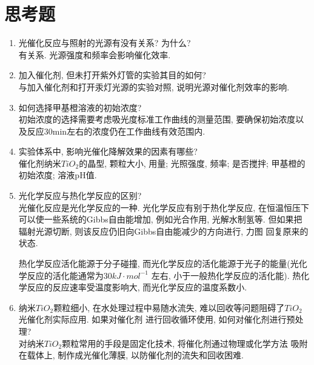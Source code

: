 \documentclass[a4paper]{article}
\begin{document}
\section{思考题}
\begin{enumerate}
	\item 光催化反应与照射的光源有没有关系? 为什么?\\
	有关系. 光源强度和频率会影响催化效率.
	\item 加入催化剂, 但未打开紫外灯管的实验其目的如何?\\
	与加入催化剂和打开汞灯光源的实验对照, 说明光源对催化剂效率的影响.
	\item 如何选择甲基橙溶液的初始浓度?\\
	初始浓度的选择需要考虑吸光度标准工作曲线的测量范围, 
	要确保初始浓度以及反应30min左右的浓度仍在工作曲线有效范围内.
	\item 实验体系中, 影响光催化降解效果的因素有哪些?\\
	催化剂纳米$TiO_{2}$的晶型, 颗粒大小, 用量; 光照强度, 频率; 是否搅拌; 
	甲基橙的初始浓度; 溶液pH值.
	\item 光化学反应与热化学反应的区别?\\
	光催化反应是光化学反应的一种. 光化学反应有别于热化学反应, 在恒温恒压下可以使一些系统的Gibbs自由能增加, 
	例如光合作用, 光解水制氢等. 但如果把辐射光源切断, 则该反应仍旧向Gibbs自由能减少的方向进行, 力图
	回复原来的状态. \par
	热化学反应活化能源于分子碰撞, 而光化学反应的活化能源于光子的能量(光化学反应的活化能通常为$30kJ\cdot mol^{-1}$
	左右, 小于一般热化学反应的活化能). 热化学反应的反应速率受温度影响大, 而光化学反应的温度系数小. \par 
	\item 纳米$TiO_{2}$颗粒细小, 在水处理过程中易随水流失, 
	难以回收等问题阻碍了$TiO_{2}$光催化剂实际应用. 如果对催化剂
	进行回收循环使用, 如何对催化剂进行预处理?\\
	对纳米$TiO_{2}$颗粒常用的手段是固定化技术, 将催化剂通过物理或化学方法
	吸附在载体上, 制作成光催化薄膜, 以防催化剂的流失和回收困难.
\end{enumerate}
\end{document}
